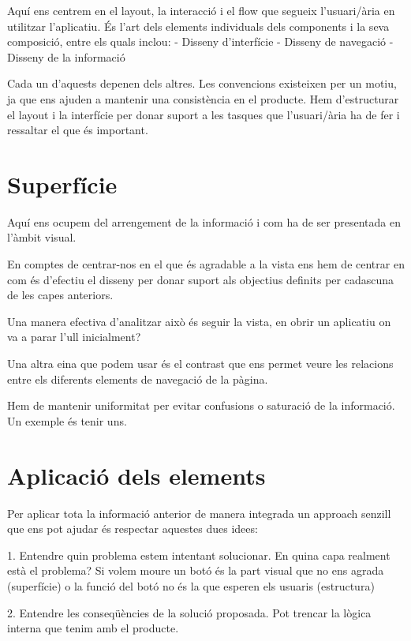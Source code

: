 \documentclass{article}
\begin{document}
Aquí ens centrem en el layout, la interacció i el flow que segueix l’usuari/ària en utilitzar l’aplicatiu. És l’art dels elements individuals dels components i la seva composició, entre els quals inclou:
- Disseny d’interfície
- Disseny de navegació
- Disseny de la informació

Cada un d’aquests depenen dels altres. Les convencions existeixen per un motiu, ja que ens ajuden a mantenir una consistència en el producte. Hem d'estructurar el layout i la interfície per donar suport a les tasques que l’usuari/ària ha de fer i ressaltar el que és important.

\section{Superfície}
\hfill



Aquí ens ocupem del arrengement de la informació i com ha de ser presentada en l'àmbit visual.

En comptes de centrar-nos en el que és agradable a la vista ens hem de centrar en com és d'efectiu el disseny per donar suport als objectius definits per cadascuna de les capes anteriors.

Una manera efectiva d'analitzar això és seguir la vista, en obrir un aplicatiu on va a parar l'ull inicialment?

Una altra eina que podem usar és el contrast que ens permet veure les relacions entre els diferents elements de navegació de la pàgina.

Hem de mantenir uniformitat per evitar confusions o saturació de la informació. Un exemple és tenir uns.


\section{Aplicació dels elements}
\hfill





Per aplicar tota la informació anterior de manera integrada un approach senzill que ens pot ajudar és respectar aquestes dues idees:

1. Entendre quin problema estem intentant solucionar. En quina capa realment està el problema? Si volem moure un botó és la part visual que no ens agrada (superfície) o la funció del botó no és la que esperen els usuaris (estructura)

2. Entendre les conseqüències de la solució proposada. Pot trencar la lògica interna que tenim amb el producte.
\end{document}
